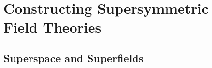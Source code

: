 





\section{Constructing Supersymmetric Field Theories}

\subsection{Superspace and Superfields}

